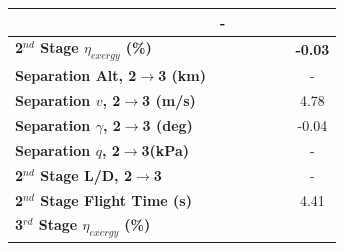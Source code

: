\begin{table}
\begin{tabular}{l c c c c c c}
	& -
	\\
	\hline 
	\textbf{2$^{nd}$ Stage $\eta_{exergy}$ (\%)}
	& \textbf{\secondExergyEffmFuelNinetyNoReturn}
	& \textbf{\secondExergyEffmFuelNinetyFiveNoReturn}
	& \textbf{\secondExergyEffmFuelStandardNoReturn}
	& \textbf{\secondExergyEffmFuelOneHundredFiveNoReturn}
	& \textbf{\secondExergyEffmFuelOneHundredTenNoReturn}
	& \textbf{-0.03}
	\\
	\textbf{Separation Alt, 2$\rightarrow$3 (km)}
	& \secondthirdSeparationAltmFuelNinetyNoReturn
	& \secondthirdSeparationAltmFuelNinetyFiveNoReturn
	& \secondthirdSeparationAltmFuelStandardNoReturn
	& \secondthirdSeparationAltmFuelOneHundredFiveNoReturn
	& \secondthirdSeparationAltmFuelOneHundredTenNoReturn
	& -
	\\
	\textbf{Separation $v$, 2$\rightarrow$3 (m/s)}
	& \secondthirdSeparationvmFuelNinetyNoReturn
	& \secondthirdSeparationvmFuelNinetyFiveNoReturn
	& \secondthirdSeparationvmFuelStandardNoReturn
	& \secondthirdSeparationvmFuelOneHundredFiveNoReturn
	& \secondthirdSeparationvmFuelOneHundredTenNoReturn
	&4.78
	\\
	\textbf{Separation $\gamma$, 2$\rightarrow$3 (deg)}
	& \secondthirdSeparationgammamFuelNinetyNoReturn
	& \secondthirdSeparationgammamFuelNinetyFiveNoReturn
	& \secondthirdSeparationgammamFuelStandardNoReturn
	& \secondthirdSeparationgammamFuelOneHundredFiveNoReturn
	& \secondthirdSeparationgammamFuelOneHundredTenNoReturn
	&-0.04
	\\
	\textbf{Separation $q$, 2$\rightarrow$3(kPa)}
	& \secondthirdSeparationqmFuelNinetyNoReturn
	& \secondthirdSeparationqmFuelNinetyFiveNoReturn
	& \secondthirdSeparationqmFuelStandardNoReturn
	& \secondthirdSeparationqmFuelOneHundredFiveNoReturn
	& \secondthirdSeparationqmFuelOneHundredTenNoReturn
	& -
	\\
	\textbf{2$^{nd}$ Stage L/D, 2$\rightarrow$3}
	& \secondthirdSeparationLDmFuelNinetyNoReturn
	& \secondthirdSeparationLDmFuelNinetyFiveNoReturn
	& \secondthirdSeparationLDmFuelStandardNoReturn
	& \secondthirdSeparationLDmFuelOneHundredFiveNoReturn
	& \secondthirdSeparationLDmFuelOneHundredTenNoReturn
	& -
	\\
	\textbf{2$^{nd}$ Stage Flight Time (s)}
	& \secondFlightTimemFuelNinetyNoReturn
	& \secondFlightTimemFuelNinetyFiveNoReturn
	& \secondFlightTimemFuelStandardNoReturn
	& \secondFlightTimemFuelOneHundredFiveNoReturn
	& \secondFlightTimemFuelOneHundredTenNoReturn
	&4.41
	\\
	\hline 
	\textbf{3$^{rd}$ Stage $\eta_{exergy}$ (\%)}
	& \textbf{\thirddExergyEffmFuelNinetyNoReturn}

\end{tabular}
\end{table}

